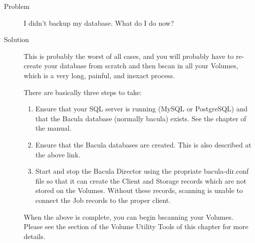 \begin{description}
\item[Problem]
  I didn't backup my database. What do I do now?
\item[Solution]
  This is probably the worst of all cases, and you will probably have
  to re-create your database from scratch and then bscan in all your
  Volumes, which is a very long, painful, and inexact process.

There are basically three steps to take:

\begin{enumerate}
\item Ensure that your SQL server is running (MySQL or PostgreSQL)
   and that the Bacula database (normally bacula) exists.  See the
    chapter of the manual.
\item Ensure that the Bacula databases are created. This is also
   described at the above link.
\item Start and stop the Bacula Director using the propriate
   bacula-dir.conf file so that it can create the Client and
   Storage records which are not stored on the Volumes.  Without these
   records, scanning is unable to connect the Job records to the proper
  client.
\end{enumerate}

When the above is complete, you can begin bscanning your Volumes. Please
see the  section of the Volume Utility Tools of this
chapter for more details.

\end{description}
